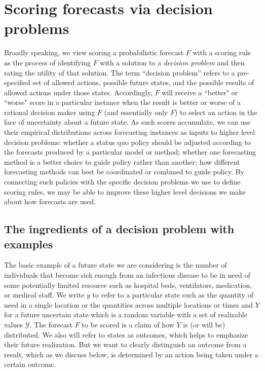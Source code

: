 \documentclass{article}
\begin{document}
\section{Scoring forecasts via decision problems}

Broadly speaking, we view scoring a probabilistic forecast $F$ with a scoring rule as the process of identifying $F$ with a solution to a \emph{decision problem} and then rating the utility of that solution.  The term ``decision problem'' refers to a pre-specified set of allowed actions, possible future states, and the possible results of allowed actions under those states.  Accordingly, $F$ will receive a ``better" or ``worse" score in a particular instance when the result is better or worse of a rational decision maker using $F$ (and essentially only $F$) to select an action in the face of uncertainty about a future state.  As such scores accumulate, we can use their empirical distributions across forecasting instances as inputs to higher level decision problems: whether a status quo policy should be adjusted according to the forecasts produced by a particular model or method; whether one forecasting method is a better choice to guide policy rather than another; how different forecasting methods can best be coordinated or combined to guide policy.  By connecting such policies with the specific decision problems we use to define 
scoring rules, we may be able to improve these higher level decisions we make about how forecasts are used.

\subsection{The ingredients of a decision problem with examples}
The basic example of a future state we are considering is the number of individuals that become sick enough from an infectious disease to be in need of some potentially limited resource such as hospital beds, ventilators, medication, or medical staff.  We write $y$ to refer to a particular state such as the quantity of need in a single location or the quantities across multiple locations or times and $Y$ for a future uncertain state which is a random variable with a set of realizable values $\mathcal{Y}$. The forecast $F$ to be scored is a claim of how $Y$ is (or will be) distributed. We also will refer to states as outcomes, which helps to emphasize their future realization.  But we want to clearly distinguish an outcome from a result, which as we discuss below, is determined by an action being taken under a certain outcome.
\end{document}
